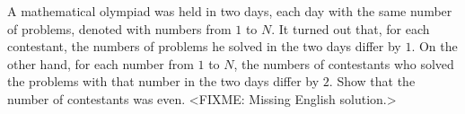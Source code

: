 \problem
A mathematical olympiad was held in two days, each day with the same number of
problems, denoted with numbers from $1$ to $N$.
It turned out that, for each contestant, the numbers of problems he solved in
the two days differ by $1$.
On the other hand, for each number from $1$ to $N$, the numbers of contestants
who solved the problems with that number in the two days differ by $2$.
Show that the number of contestants was even.
\solution
<FIXME: Missing English solution.>
\endproblem
